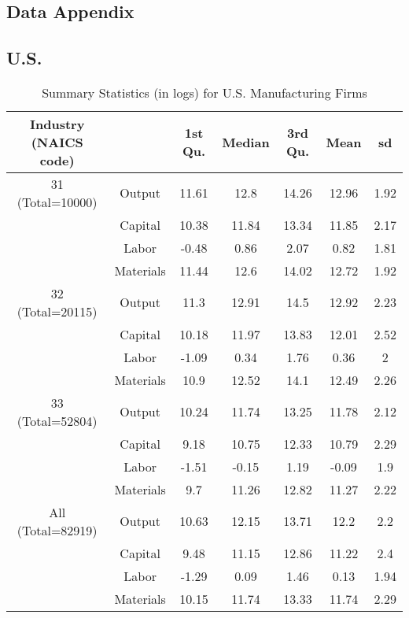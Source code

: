 \documentclass[12pt]{article}
\begin{document}
\begin{appendices}
\section{Data Appendix}\label{data}
\subsection{U.S.} \label{USdata}

\begin{table}[H]
\centering
\caption{Summary Statistics (in logs) for U.S. Manufacturing Firms}
\small
\begin{tabular}{ccccccc}
  \hline\hline Industry (NAICS code) &   & 1st Qu. & Median & 3rd Qu. & Mean & sd \\ 
  \hline
31 (Total=10000) & Output & 11.61 & 12.8 & 14.26 & 12.96 & 1.92 \\ 
   & Capital & 10.38 & 11.84 & 13.34 & 11.85 & 2.17 \\ 
   & Labor & -0.48 & 0.86 & 2.07 & 0.82 & 1.81 \\ 
   & Materials & 11.44 & 12.6 & 14.02 & 12.72 & 1.92 \\ 
  32 (Total=20115) & Output & 11.3 & 12.91 & 14.5 & 12.92 & 2.23 \\ 
   & Capital & 10.18 & 11.97 & 13.83 & 12.01 & 2.52 \\ 
   & Labor & -1.09 & 0.34 & 1.76 & 0.36 & 2 \\ 
   & Materials & 10.9 & 12.52 & 14.1 & 12.49 & 2.26 \\ 
  33 (Total=52804) & Output & 10.24 & 11.74 & 13.25 & 11.78 & 2.12 \\ 
   & Capital & 9.18 & 10.75 & 12.33 & 10.79 & 2.29 \\ 
   & Labor & -1.51 & -0.15 & 1.19 & -0.09 & 1.9 \\ 
   & Materials & 9.7 & 11.26 & 12.82 & 11.27 & 2.22 \\ 
  All (Total=82919) & Output & 10.63 & 12.15 & 13.71 & 12.2 & 2.2 \\ 
   & Capital & 9.48 & 11.15 & 12.86 & 11.22 & 2.4 \\ 
   & Labor & -1.29 & 0.09 & 1.46 & 0.13 & 1.94 \\ 
   & Materials & 10.15 & 11.74 & 13.33 & 11.74 & 2.29 \\ 
   \hline
   \hline
\end{tabular}
\label{USsum}
\end{table}


\end{appendices}
\end{document}

